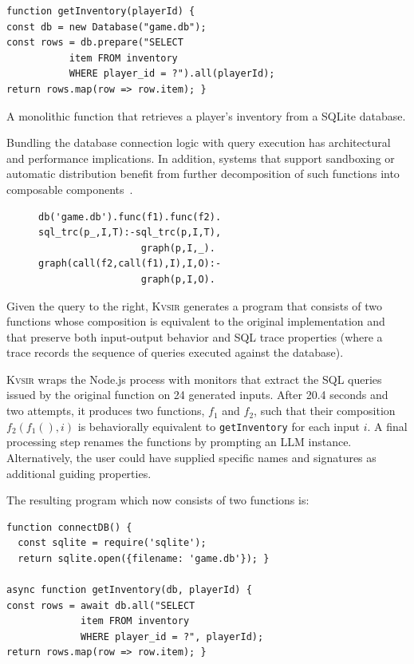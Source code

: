 \documentclass[sigplan,review,anonymous,10pt]{acmart}
\newcommand{\sys}{{\scshape Kv{\textalpha}sir}\xspace}
\begin{document}
\begin{listing}
\begin{verbatim}
function getInventory(playerId) {
const db = new Database("game.db");
const rows = db.prepare("SELECT
           item FROM inventory
           WHERE player_id = ?").all(playerId);
return rows.map(row => row.item); }
\end{verbatim}
\caption{A monolithic function that retrieves a player's inventory from a SQLite database.}
\label{listing:monolithic-sql}
\end{listing}

Bundling the database connection logic with query execution has architectural
and performance implications. In addition, systems that support sandboxing or
automatic distribution benefit from further decomposition of such functions
into composable components~\cite{Towards_Modern_Ghemaw_2023, vasilakis2019ignis, vasilakis2018breakapp}.

\begin{figure}
  \begin{verbatim}
db('game.db').func(f1).func(f2).
sql_trc(p_,I,T):-sql_trc(p,I,T),
                  graph(p,I,_).
graph(call(f2,call(f1),I),I,O):-
                  graph(p,I,O).
  \end{verbatim}
\end{figure}

Given the query to the right, \sys generates a program that consists of two
functions whose composition is equivalent to the original implementation and
that preserve both input-output behavior and SQL trace properties (where a trace records
the sequence of queries executed against the database).

\sys wraps the Node.js process with monitors that extract the SQL queries
issued by the original function on 24 generated inputs.
After 20.4 seconds and
two attempts, it produces two functions, $f_1$ and $f_2$, such that their
composition $f_2(f_1(), i)$ is behaviorally equivalent to \texttt{getInventory}
for each input $i$.
A final processing step renames the functions by prompting
an LLM instance.
Alternatively, the user could have supplied specific names and
signatures as additional guiding properties.

The resulting program which now consists of two functions is:
\begin{verbatim}
function connectDB() {
  const sqlite = require('sqlite');
  return sqlite.open({filename: 'game.db'}); }

async function getInventory(db, playerId) {
const rows = await db.all("SELECT 
             item FROM inventory
             WHERE player_id = ?", playerId);
return rows.map(row => row.item); }
\end{verbatim}
\end{document}
